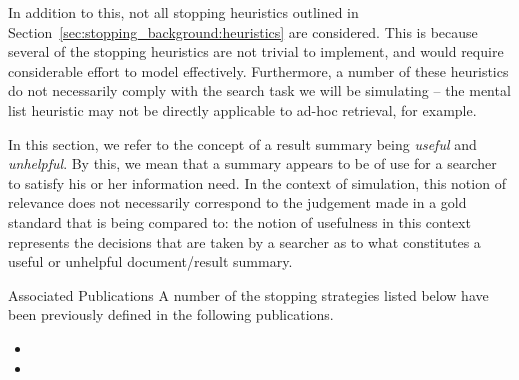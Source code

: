 In addition to this, not all stopping heuristics outlined in Section~\ref{sec:stopping_background:heuristics} are considered. This is because several of the stopping heuristics are not trivial to implement, and would require considerable effort to model effectively. Furthermore, a number of these heuristics do not necessarily comply with the search task we will be simulating -- the mental list heuristic may not be directly applicable to ad-hoc retrieval, for example.


\noindent{} In this section, we refer to the concept of a result summary being \emph{useful} and \emph{unhelpful}. By this, we mean that a summary appears to be of use for a searcher to satisfy his or her information need. In the context of simulation, this notion of relevance does not necessarily correspond to the judgement made in a gold standard that is being compared to: the notion of usefulness in this context represents the decisions that are taken by a searcher as to what constitutes a useful or unhelpful document/result summary.

\begin{publications_box}{Associated Publications}
A number of the stopping strategies listed below have been previously defined in the following publications.
\vspace*{-2mm}
\begin{itemize}
    \item{}
    \item{}
\end{itemize}
\end{publications_box}

